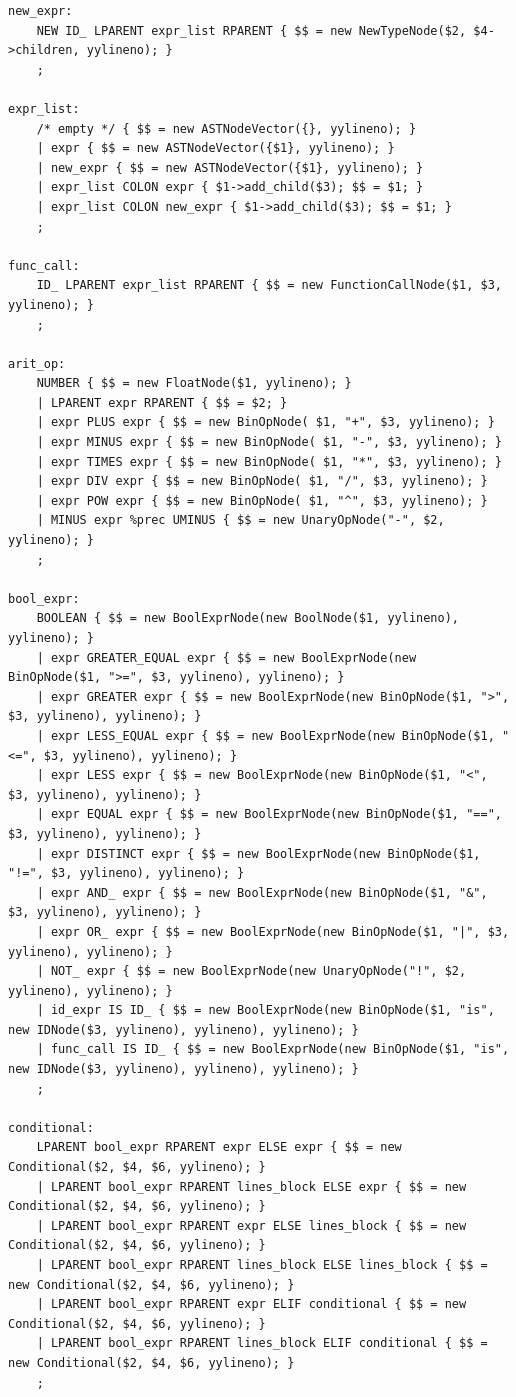 \documentclass{article}
\begin{document}
\begin{verbatim}
new_expr:
	NEW ID_ LPARENT expr_list RPARENT { $$ = new NewTypeNode($2, $4->children, yylineno); }
	;

expr_list:
	/* empty */ { $$ = new ASTNodeVector({}, yylineno); }
	| expr { $$ = new ASTNodeVector({$1}, yylineno); }
	| new_expr { $$ = new ASTNodeVector({$1}, yylineno); }
	| expr_list COLON expr { $1->add_child($3); $$ = $1; }
	| expr_list COLON new_expr { $1->add_child($3); $$ = $1; }
	;

func_call:
	ID_ LPARENT expr_list RPARENT { $$ = new FunctionCallNode($1, $3, yylineno); }
	;

arit_op:
	NUMBER { $$ = new FloatNode($1, yylineno); }
	| LPARENT expr RPARENT { $$ = $2; }
	| expr PLUS expr { $$ = new BinOpNode( $1, "+", $3, yylineno); }
	| expr MINUS expr { $$ = new BinOpNode( $1, "-", $3, yylineno); }
	| expr TIMES expr { $$ = new BinOpNode( $1, "*", $3, yylineno); }
	| expr DIV expr { $$ = new BinOpNode( $1, "/", $3, yylineno); }
	| expr POW expr { $$ = new BinOpNode( $1, "^", $3, yylineno); }
	| MINUS expr %prec UMINUS { $$ = new UnaryOpNode("-", $2, yylineno); }
	;

bool_expr:
	BOOLEAN { $$ = new BoolExprNode(new BoolNode($1, yylineno), yylineno); }
	| expr GREATER_EQUAL expr { $$ = new BoolExprNode(new BinOpNode($1, ">=", $3, yylineno), yylineno); }
	| expr GREATER expr { $$ = new BoolExprNode(new BinOpNode($1, ">", $3, yylineno), yylineno); }
	| expr LESS_EQUAL expr { $$ = new BoolExprNode(new BinOpNode($1, "<=", $3, yylineno), yylineno); }
	| expr LESS expr { $$ = new BoolExprNode(new BinOpNode($1, "<", $3, yylineno), yylineno); }
	| expr EQUAL expr { $$ = new BoolExprNode(new BinOpNode($1, "==", $3, yylineno), yylineno); }
	| expr DISTINCT expr { $$ = new BoolExprNode(new BinOpNode($1, "!=", $3, yylineno), yylineno); }
	| expr AND_ expr { $$ = new BoolExprNode(new BinOpNode($1, "&", $3, yylineno), yylineno); }
	| expr OR_ expr { $$ = new BoolExprNode(new BinOpNode($1, "|", $3, yylineno), yylineno); }
	| NOT_ expr { $$ = new BoolExprNode(new UnaryOpNode("!", $2, yylineno), yylineno); }
	| id_expr IS ID_ { $$ = new BoolExprNode(new BinOpNode($1, "is", new IDNode($3, yylineno), yylineno), yylineno); }
	| func_call IS ID_ { $$ = new BoolExprNode(new BinOpNode($1, "is", new IDNode($3, yylineno), yylineno), yylineno); }
	;

conditional:
	LPARENT bool_expr RPARENT expr ELSE expr { $$ = new Conditional($2, $4, $6, yylineno); }
	| LPARENT bool_expr RPARENT lines_block ELSE expr { $$ = new Conditional($2, $4, $6, yylineno); }
	| LPARENT bool_expr RPARENT expr ELSE lines_block { $$ = new Conditional($2, $4, $6, yylineno); }
	| LPARENT bool_expr RPARENT lines_block ELSE lines_block { $$ = new Conditional($2, $4, $6, yylineno); }
	| LPARENT bool_expr RPARENT expr ELIF conditional { $$ = new Conditional($2, $4, $6, yylineno); }
	| LPARENT bool_expr RPARENT lines_block ELIF conditional { $$ = new Conditional($2, $4, $6, yylineno); }
	;


\end{verbatim}
\end{document}

